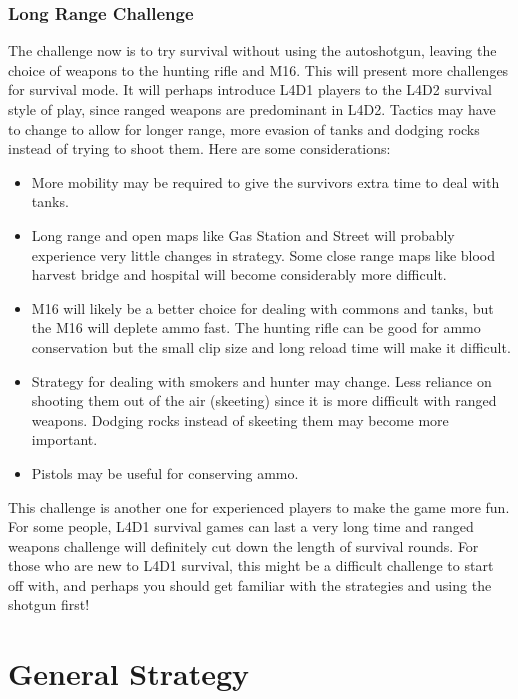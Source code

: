\subsubsection{Long Range Challenge}
The challenge now is to try survival without using the autoshotgun, leaving the choice of weapons to the hunting rifle and M16. This will present more challenges for survival mode. It will perhaps introduce L4D1 players to the L4D2 survival style of play, since ranged weapons are predominant in L4D2. Tactics may have to change to allow for longer range, more evasion of tanks and dodging rocks instead of trying to shoot them. Here are some considerations:
\begin{itemize}
\item More mobility may be required to give the survivors extra time to deal with tanks.
\item Long range and open maps like Gas Station and Street will probably experience very little changes in strategy. Some close range maps like blood harvest bridge and hospital will become considerably more difficult.
\item M16 will likely be a better choice for dealing with commons and tanks, but the M16 will deplete ammo fast. The hunting rifle can be good for ammo conservation but the small clip size and long reload time will make it difficult.
\item Strategy for dealing with smokers and hunter may change. Less reliance on shooting them out of the air (skeeting) since it is more difficult with ranged weapons. Dodging rocks instead of skeeting them may become more important.
\item Pistols may be useful for conserving ammo.
\end{itemize}

This challenge is another one for experienced players to make the game more fun. For some people, L4D1 survival games can last a very long time and ranged weapons challenge will definitely cut down the length of survival rounds. For those who are new to L4D1 survival, this might be a difficult challenge to start off with, and perhaps you should get familiar with the strategies and using the shotgun first!

\section{General Strategy}

